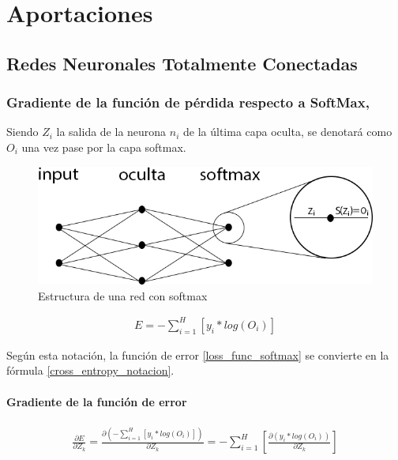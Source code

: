 \chapter{Aportaciones}

\section{Redes Neuronales Totalmente Conectadas}

\subsection{Gradiente de la función de pérdida respecto a SoftMax, \cite{Cross_entropy_backprop} \cite{Cross_entropy_backprop_grad_input}} 

Siendo $Z_i$ la salida de la neurona $n_i$ de la última capa oculta, se denotará como $O_i$ una vez pase por la capa softmax. \\

\begin{figure}[H]
	\centering
	\includegraphics[scale=0.4]{imagenes/NN_softmax.jpg}  
	\caption{Estructura de una red con softmax}
\end{figure}

\begin{gather}
	E = - \sum_{i=1}^{H}  [y_i * log(O_i)] 
	\label{cross_entropy_notacion}
\end{gather}

Según esta notación, la función de error \ref{loss_func_softmax} se convierte en la fórmula \ref{cross_entropy_notacion}.

\subsubsection{Gradiente de la función de error}

\begin{gather}
	\frac{\partial E}{\partial Z_k} = \frac{\partial(- \sum_{i=1}^{H}  [y_i * log(O_i)])}{\partial Z_k} = - \sum_{i=1}^{H}  [\frac{\partial(y_i * log(O_i))}{\partial Z_k}] 
\end{gather}


